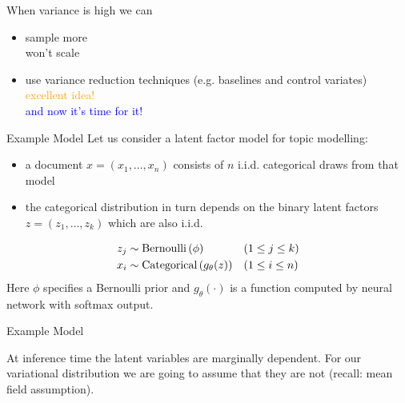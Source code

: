 \begin{frame}{When variance is high we can}

\begin{itemize}
	\item sample more \\ \pause
	\alert{won't scale} \pause
	\item use variance reduction techniques (e.g. baselines and control variates)\\ \pause 		\textcolor{orange}{excellent idea!} \pause \\
	\textcolor{blue}{and now it's time for it!}
\end{itemize}
\end{frame}


\begin{frame}{Example Model}
Let us consider a latent factor model for topic modelling: \pause

\begin{itemize}
	\item a document $ x = (x_{1},\ldots,x_{n})$ consists of $ n $ i.i.d. categorical draws from that model \pause
	\item the categorical distribution in turn depends on the binary latent factors $ z = (z_{1},\ldots,z_{k}) $ which are also i.i.d. \pause
\end{itemize}

\begin{equation*}
\begin{aligned}
z_{j} &\sim \operatorname{Bernoulli}\left(\phi\right) && (1 \leq j \leq k) \\ 
x_{i} &\sim \operatorname{Categorical}\left(g_\theta(z)\right) && (1 \leq i \leq n)
\end{aligned}
\end{equation*} 
Here $\phi$ specifies a Bernoulli prior and $ g_\theta(\cdot) $ is a function computed by neural network with softmax output.
\end{frame}

\begin{frame}{Example Model}
\begin{figure}
\center
{}
\end{figure}
At inference time the latent variables are marginally dependent. For our variational distribution
we are going to assume that they are not (recall: mean field assumption).
\end{frame}

